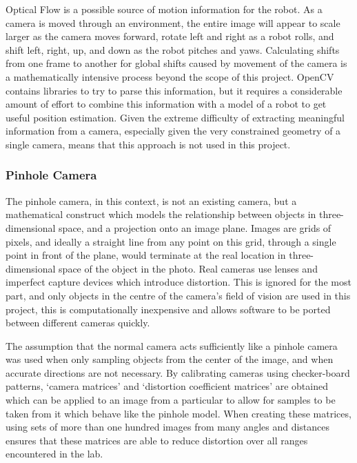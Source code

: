 \documentclass{article}[12]
\begin{document}
		Optical Flow is a possible source of motion information for the robot. As a camera is moved through an environment, the entire image will appear to scale larger as the camera moves forward, rotate left and right as a robot rolls, and shift left, right, up, and down as the robot pitches and yaws. Calculating shifts from one frame to another for global shifts caused by movement of the camera is a mathematically intensive process beyond the scope of this project. OpenCV contains libraries to try to parse this information, but it requires a considerable amount of effort to combine this information with a model of a robot to get useful position estimation. Given the extreme difficulty of extracting meaningful information from a camera, especially given the very constrained geometry of a single camera, means that this approach is not used in this project.
		
		\subsubsection{Pinhole Camera}
		
		The pinhole camera, in this context, is not an existing camera, but a mathematical construct which models the relationship between objects in three-dimensional space, and a projection onto an image plane. Images are grids of pixels, and ideally a straight line from any point on this grid, through a single point in front of the plane, would terminate at the real location in three-dimensional space of the object in the photo. Real cameras use lenses and imperfect capture devices which introduce distortion. This is ignored for the most part, and only objects in the centre of the camera's field of vision are used in this project, this is computationally inexpensive and allows software to be ported between different cameras quickly.
		
		The assumption that the normal camera acts sufficiently like a pinhole camera was used when only sampling objects from the center of the image, and when accurate directions are not necessary. By calibrating cameras using checker-board patterns, `camera matrices' and `distortion coefficient matrices' are obtained which can be applied to an image from a particular to allow for samples to be taken from it which behave like the pinhole model. When creating these matrices, using sets of more than one hundred images from many angles and distances ensures that these matrices are able to reduce distortion over all ranges encountered in the lab.
		
\end{document}
